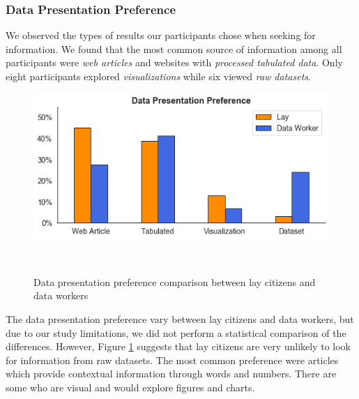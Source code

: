 \documentclass{sigchi}
\begin{document}
\subsubsection{Data Presentation Preference}
We observed the types of results our participants chose when seeking for information. We found that the most common source of information among all participants were \textit{web articles} and websites with \textit{processed tabulated data}. Only eight participants explored \textit{visualizations} while six viewed \textit{raw datasets}.

\begin{figure}[tp]
\centering
 \includegraphics[width=0.9\columnwidth]{figures/datapresentation.png}
 \caption{Data presentation preference comparison between lay citizens and data workers}~\label{fig:datapresentation}
\end{figure}

The data presentation preference vary between lay citizens and data workers, but due to our study limitations, we did not perform a statistical comparison of the differences. However, Figure \ref{fig:datapresentation} suggests that lay citizens are very unlikely to look for information from raw datasets. The most common preference were articles which provide contextual information through words and numbers. There are some who are visual and would explore figures and charts.
\end{document}
